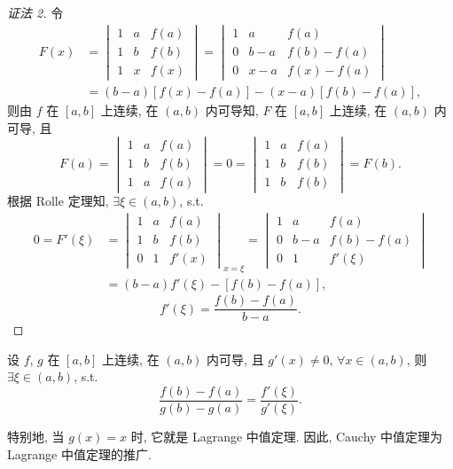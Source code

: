 \begin{proof}[证法 2]
令
\[
\begin{aligned}
F(x)&=\begin{vmatrix}1&a&f(a)\\1&b&f(b)\\1&x&f(x)\end{vmatrix}=\begin{vmatrix}1&a&f(a)\\0&b-a&f(b)-f(a)\\0&x-a&f(x)-f(a)\end{vmatrix}\\
&=(b-a)[f(x)-f(a)]-(x-a)[f(b)-f(a)],
\end{aligned}
\]
则由 $f$ 在 $[a,b]$ 上连续, 在 $(a,b)$ 内可导知, $F$ 在 $[a,b]$ 上连续, 在 $(a,b)$ 内可导, 且
\[
F(a)=\begin{vmatrix}1&a&f(a)\\1&b&f(b)\\1&a&f(a)\end{vmatrix}=0=\begin{vmatrix}1&a&f(a)\\1&b&f(b)\\1&b&f(b)\end{vmatrix}=F(b).
\]
根据 Rolle 定理知, $\exists\xi\in(a,b)$, s.t.
\[
\begin{aligned}
0=F'(\xi)&=\begin{vmatrix}1&a&f(a)\\1&b&f(b)\\0&1&f'(x)\end{vmatrix}_{x=\xi}=\begin{vmatrix}1&a&f(a)\\0&b-a&f(b)-f(a)\\0&1&f'(\xi)\end{vmatrix}\\
&=(b-a)f'(\xi)-[f(b)-f(a)],
\end{aligned}
\]
\[
f'(\xi)=\frac{f(b)-f(a)}{b-a}.
\]
\end{proof}

\begin{theorem}\label{thm:3.3.4}
设 $f$, $g$ 在 $[a,b]$ 上连续, 在 $(a,b)$ 内可导, 且 $g'(x)\neq0$, $\forall x\in(a,b)$, 则 $\exists\xi\in(a,b)$, s.t.
\[
\frac{f(b)-f(a)}{g(b)-g(a)}=\frac{f'(\xi)}{g'(\xi)}.
\]
\end{theorem}

特别地, 当 $g(x)=x$ 时, 它就是 Lagrange 中值定理. 因此, Cauchy 中值定理为 Lagrange 中值定理的推广.


